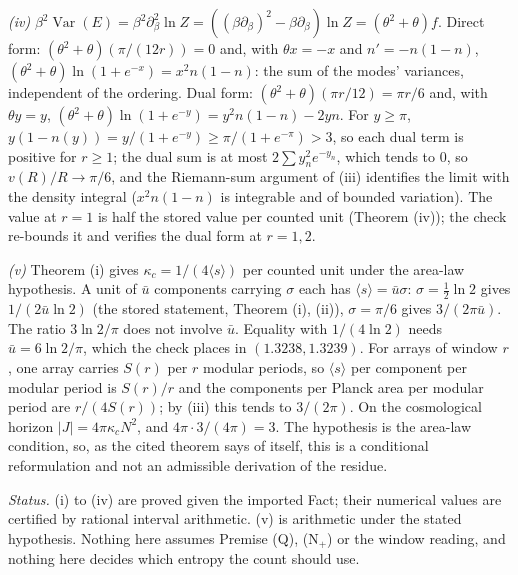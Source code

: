 \emph{(iv)} $\beta^{2}\operatorname{Var}(E) = \beta^{2}\partial_{\beta}^{2}\ln Z = ((\beta\partial_{\beta})^{2} - \beta\partial_{\beta})\ln Z = (\theta^{2} + \theta)f$. Direct form: $(\theta^{2} + \theta)(\pi/(12r)) = 0$ and, with $\theta x = -x$ and $n' = -n(1 - n)$, $(\theta^{2} + \theta)\ln(1 + e^{-x}) = x^{2}n(1 - n)$: the sum of the modes' variances, independent of the ordering. Dual form: $(\theta^{2} + \theta)(\pi r/12) = \pi r/6$ and, with $\theta y = y$, $(\theta^{2} + \theta)\ln(1 + e^{-y}) = y^{2}n(1 - n) - 2yn$. For $y \ge \pi$, $y(1 - n(y)) = y/(1 + e^{-y}) \ge \pi/(1 + e^{-\pi}) > 3$, so each dual term is positive for $r \ge 1$; the dual sum is at most $2\sum y_{n}^{2}e^{-y_{n}}$, which tends to $0$, so $v(R)/R \to \pi/6$, and the Riemann-sum argument of (iii) identifies the limit with the density integral ($x^{2}n(1 - n)$ is integrable and of bounded variation). The value at $r = 1$ is half the stored value per counted unit (Theorem (iv)); the check re-bounds it and verifies the dual form at $r = 1, 2$.

\emph{(v)} Theorem (i) gives $\kappa_{c} = 1/(4\langle s\rangle)$ per counted unit under the area-law hypothesis. A unit of $\bar u$ components carrying $\sigma$ each has $\langle s\rangle = \bar u\sigma$: $\sigma = \tfrac12\ln 2$ gives $1/(2\bar u\ln 2)$ (the stored statement, Theorem (i), (ii)), $\sigma = \pi/6$ gives $3/(2\pi\bar u)$. The ratio $3\ln 2/\pi$ does not involve $\bar u$. Equality with $1/(4\ln 2)$ needs $\bar u = 6\ln 2/\pi$, which the check places in $(1.3238, 1.3239)$. For arrays of window $r$, one array carries $S(r)$ per $r$ modular periods, so $\langle s\rangle$ per component per modular period is $S(r)/r$ and the components per Planck area per modular period are $r/(4S(r))$; by (iii) this tends to $3/(2\pi)$. On the cosmological horizon $|J| = 4\pi\kappa_{c}N^{2}$, and $4\pi \cdot 3/(4\pi) = 3$. The hypothesis is the area-law condition, so, as the cited theorem says of itself, this is a conditional reformulation and not an admissible derivation of the residue.

\emph{Status.} (i) to (iv) are proved given the imported Fact; their numerical values are certified by rational interval arithmetic. (v) is arithmetic under the stated hypothesis. Nothing here assumes Premise (Q), (N$_{+}$) or the window reading, and nothing here decides which entropy the count should use.
